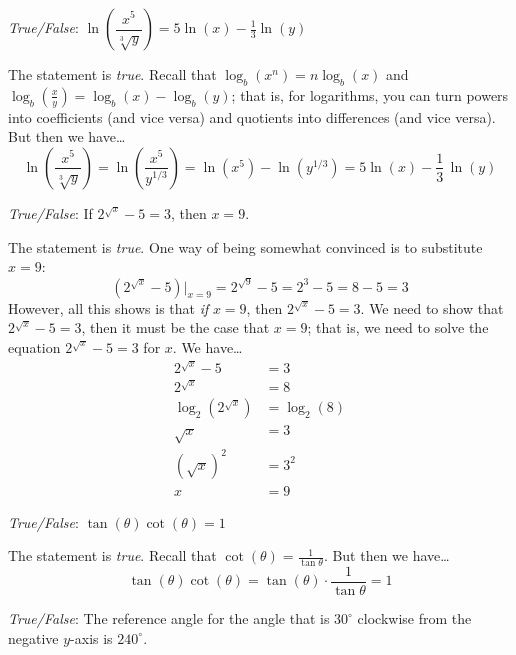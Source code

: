 \documentclass[11pt,letterpaper]{article}
\begin{document}
\quizsol \textit{True/False}: $\ln\left( \dfrac{x^5}{\sqrt[3]{y}} \right)= 5 \ln(x) - \frac{1}{3} \ln(y)$ \pspace

\sol The statement is \textit{true}. Recall that $\log_b(x^n)= n \log_b(x)$ and $\log_b \left( \frac{x}{y} \right)= \log_b(x) - \log_b(y)$; that is, for logarithms, you can turn powers into coefficients (and vice versa) and quotients into differences (and vice versa). But then we have\dots
	\[
	\ln\left( \dfrac{x^5}{\sqrt[3]{y}} \right)= \ln\left( \dfrac{x^5}{y^{1/3}} \right)= \ln(x^5) - \ln(y^{1/3})= 5 \ln(x) - \frac{1}{3}\, \ln(y)
	\] \pvspace{1.3cm}



\quizsol \textit{True/False}: If $2^{\sqrt{x}} - 5= 3$, then $x= 9$. \pspace

\sol The statement is \textit{true}. One way of being somewhat convinced is to substitute $x= 9$:
	\[
	\left( 2^{\sqrt{x}} - 5 \right) \bigg|_{x= 9}= 2^{\sqrt{9}} - 5= 2^3 - 5= 8 - 5= 3
	\]
However, all this shows is that \textit{if} $x= 9$, then $2^{\sqrt{x}} - 5= 3$. We need to show that $2^{\sqrt{x}} - 5= 3$, then it must be the case that $x= 9$; that is, we need to solve the equation $2^{\sqrt{x}} - 5= 3$ for $x$. We have\dots
	\[
	\begin{aligned}
	2^{\sqrt{x}} - 5&= 3 \\[0.3cm]
	2^{\sqrt{x}}&= 8 \\[0.3cm]
	\log_2 \left( 2^{\sqrt{x}} \right)&= \log_2(8) \\[0.3cm]
	\sqrt{x}&= 3 \\[0.3cm]
	(\sqrt{x})^2&= 3^2 \\[0.3cm]
	x&= 9
	\end{aligned}
	\]



\newpage



\quizsol \textit{True/False}: $\tan(\theta) \cot(\theta)= 1$ \pspace

\sol The statement is \textit{true}. Recall that $\cot(\theta)= \frac{1}{\tan \theta}$. But then we have\dots
	\[
	\tan(\theta) \cot(\theta)= \tan(\theta) \cdot \dfrac{1}{\tan \theta}= 1
	\] \pvspace{1.3cm} 



\quizsol \textit{True/False}: The reference angle for the angle that is $30^\circ$ clockwise from the negative $y$-axis is $240^\circ$. \pspace
\end{document}
